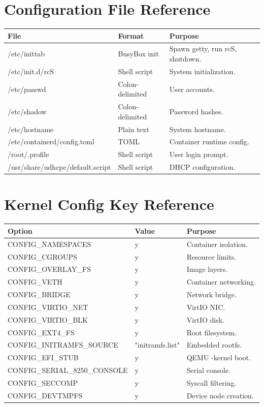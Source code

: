 \section{Configuration File Reference}

\begin{longtable}{|p{4cm}|p{3cm}|p{5cm}|}
\hline
\textbf{File} & \textbf{Format} & \textbf{Purpose} \\
\hline
/etc/inittab & BusyBox init & Spawn getty, run rcS, shutdown. \\
/etc/init.d/rcS & Shell script & System initialization. \\
/etc/passwd & Colon-delimited & User accounts. \\
/etc/shadow & Colon-delimited & Password hashes. \\
/etc/hostname & Plain text & System hostname. \\
/etc/containerd/config.toml & TOML & Container runtime config. \\
/root/.profile & Shell script & User login prompt. \\
/usr/share/udhcpc/default.script & Shell script & DHCP configuration. \\
\hline
\end{longtable}

\section{Kernel Config Key Reference}

\begin{longtable}{|p{5cm}|p{3cm}|p{5cm}|}
\hline
\textbf{Option} & \textbf{Value} & \textbf{Purpose} \\
\hline
CONFIG\_NAMESPACES & y & Container isolation. \\
CONFIG\_CGROUPS & y & Resource limits. \\
CONFIG\_OVERLAY\_FS & y & Image layers. \\
CONFIG\_VETH & y & Container networking. \\
CONFIG\_BRIDGE & y & Network bridge. \\
CONFIG\_VIRTIO\_NET & y & VirtIO NIC. \\
CONFIG\_VIRTIO\_BLK & y & VirtIO disk. \\
CONFIG\_EXT4\_FS & y & Root filesystem. \\
CONFIG\_INITRAMFS\_SOURCE & "initramfs.list" & Embedded rootfs. \\
CONFIG\_EFI\_STUB & y & QEMU -kernel boot. \\
CONFIG\_SERIAL\_8250\_CONSOLE & y & Serial console. \\
CONFIG\_SECCOMP & y & Syscall filtering. \\
CONFIG\_DEVTMPFS & y & Device node creation. \\
\hline
\end{longtable}


